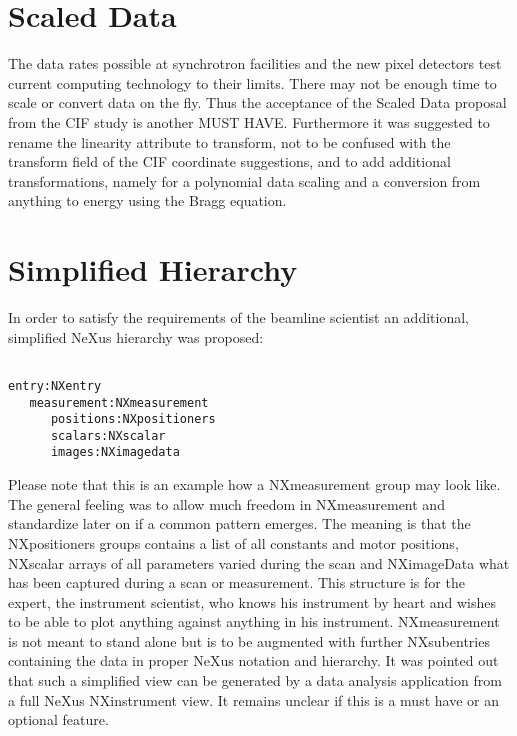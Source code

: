 \documentclass[a4paper]{article}\usepackage[dvips]{graphicx}
\begin{document}
\section{Scaled Data }

The data rates possible at synchrotron facilities and the new pixel detectors test current computing 
 technology to their limits. There may not be enough time to scale or convert data on the fly. Thus the 
acceptance of the Scaled Data proposal from the CIF study is another MUST HAVE. Furthermore it was 
suggested to rename the linearity attribute to transform, not to be confused with the transform field of 
the CIF coordinate suggestions,  and to add additional transformations, namely for a polynomial 
data scaling and a conversion from anything to energy using the Bragg equation. 





\section{Simplified Hierarchy }

In order to satisfy the requirements of the beamline scientist an additional, simplified 
NeXus hierarchy was proposed:


\begin{verbatim}

entry:NXentry
   measurement:NXmeasurement
      positions:NXpositioners
      scalars:NXscalar
      images:NXimagedata
\end{verbatim}
  
Please note that this is an example how a NXmeasurement group may look like. The general feeling was 
to allow much freedom in NXmeasurement and standardize later on if a common pattern emerges. 
The meaning is that the NXpositioners groups contains a list of all constants and motor positions, 
NXscalar arrays of all parameters varied during the scan and NXimageData what has been captured 
during a scan or measurement. This structure is for the expert, the instrument scientist, who knows 
his instrument by heart and wishes to be able to plot anything against anything in his instrument. 
NXmeasurement is not meant to stand alone but is to be augmented with further NXsubentries 
containing the data in proper NeXus notation and hierarchy. It was pointed out that such a 
simplified view can be generated by a data analysis application from a full NeXus NXinstrument view. 
It remains unclear if this is a must have or an optional feature. 
\end{document}
